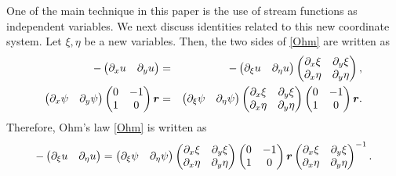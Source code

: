 \documentclass[11pt]{amsart}
\theoremstyle{plain}
\numberwithin{equation}{section}
\numberwithin{Thm}{section}
\def\r{{\bf r}}
\def\r{\mbox{\boldmath$r$}}
\begin{document}
One of the main technique in this paper is the use of stream functions as independent variables. We next discuss identities related to this new coordinate system. Let $\xi,\eta$ be a new variables. Then, the two sides of \eqref{Ohm} are written as
\begin{eqnarray*}
  -\begin{pmatrix} \partial_x u & \partial_y u \end{pmatrix} &=&-\begin{pmatrix} \partial_\xi u & \partial_\eta u \end{pmatrix} \begin{pmatrix} \partial_x\xi & \partial_y\xi \\ \partial_x\eta & \partial_y\eta\end{pmatrix},\\
  \begin{pmatrix} \partial_x \psi &  \partial_y \psi \end{pmatrix}
  \begin{pmatrix} 0 & -1 \\ 1 & 0 \end{pmatrix}\r
  &=&\begin{pmatrix} \partial_\xi \psi &  \partial_\eta \psi \end{pmatrix}
  \begin{pmatrix} \partial_x\xi & \partial_y\xi \\ \partial_x\eta & \partial_y\eta\end{pmatrix}
  \begin{pmatrix} 0 & -1 \\ 1 & 0 \end{pmatrix}\r.
\end{eqnarray*}
Therefore, Ohm's law \eqref{Ohm} is written as
$$
  -\begin{pmatrix} \partial_\xi u & \partial_\eta u \end{pmatrix}=\begin{pmatrix} \partial_\xi \psi &  \partial_\eta \psi \end{pmatrix}
  \begin{pmatrix} \partial_x\xi & \partial_y\xi \\ \partial_x\eta & \partial_y\eta\end{pmatrix}
  \begin{pmatrix} 0 & -1 \\ 1 & 0 \end{pmatrix}\r
  \begin{pmatrix} \partial_x\xi & \partial_y\xi \\ \partial_x\eta & \partial_y\eta\end{pmatrix}^{-1}.
$$
\end{document}
